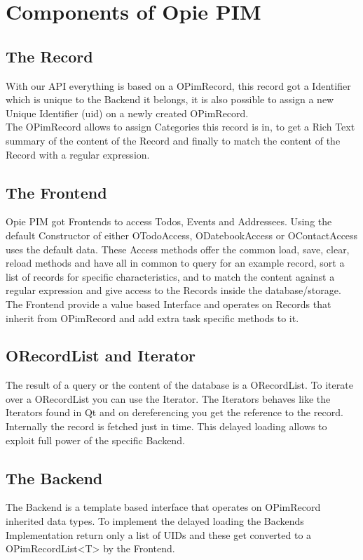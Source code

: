 \section{Components of Opie PIM}

\subsection{The Record}
With our API everything is based on a  OPimRecord, this record
got a Identifier which is unique to the Backend it belongs, it is
also possible to assign a new Unique Identifier (uid) on a newly
created OPimRecord.\\
The OPimRecord allows to assign Categories this record is in, to get
a Rich Text summary of the content of the Record and finally to match 
the content of the Record with a regular expression.

\subsection{The Frontend}
Opie PIM got Frontends to access Todos, Events and Addressees. Using
the default Constructor of either OTodoAccess, ODatebookAccess or
OContactAccess uses the default data. These Access methods offer
the common load, save, clear, reload methods and have all in common
to query for an example record, sort a list of records for specific
characteristics, and to match the content against a regular expression
 and give access to the Records inside the database/storage.\\
The Frontend provide a value based Interface and operates on Records
that inherit from OPimRecord and add extra task specific methods to it.

\subsection{ORecordList and Iterator}
The result of a query or the content of the database is a ORecordList.
To iterate over a ORecordList you can use the Iterator. The Iterators
behaves like the Iterators found in Qt and on dereferencing you get
the reference to the record. Internally the record is fetched just
in time. This delayed loading allows to exploit full power of the specific
Backend.


\subsection{The Backend}
The Backend is a template based interface that operates on OPimRecord
inherited data types. To implement the delayed loading the Backends
Implementation return only a list of UIDs and these get converted
to a OPimRecordList<T> by the Frontend.

